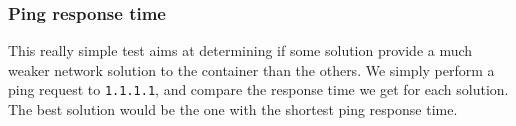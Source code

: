 \subsubsection{Ping response time}
This really simple test aims at determining if some solution provide a much weaker network solution to the container than the others.  We simply perform a ping request to \texttt{1.1.1.1}, and compare the response time we get for each solution.  The best solution would be the one with the shortest ping response time.
